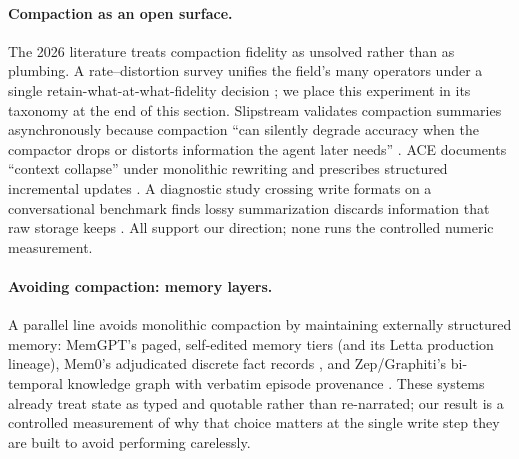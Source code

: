 \documentclass[11pt]{article}
\begin{document}
\paragraph{Compaction as an open surface.}
The 2026 literature treats compaction fidelity as unsolved rather than as
plumbing. A rate--distortion survey unifies the field's many operators under
a single retain-what-at-what-fidelity decision
\citep{colaco2026ratedistortion}; we place this experiment in its taxonomy at
the end of this section.
Slipstream validates compaction summaries asynchronously because compaction
``can silently degrade accuracy when the compactor drops or distorts
information the agent later needs'' \citep{chen2026slipstream}.
ACE documents ``context collapse'' under monolithic rewriting and prescribes
structured incremental updates \citep{zhang2025ace}. A diagnostic study
crossing write formats on a conversational benchmark finds lossy summarization
discards information that raw storage keeps \citep{yuan2026diagnosing}. All
support our direction; none runs the controlled numeric measurement.

\paragraph{Avoiding compaction: memory layers.}
A parallel line avoids monolithic compaction by maintaining externally
structured memory: MemGPT's paged, self-edited memory tiers
\citep{packer2023memgpt} (and its Letta production lineage), Mem0's
adjudicated discrete fact records \citep{chhikara2025mem0}, and Zep/Graphiti's
bi-temporal knowledge graph with verbatim episode provenance
\citep{rasmussen2025zep}. These systems already treat state as typed and
quotable rather than re-narrated; our result is a controlled measurement of
why that choice matters at the single write step they are built to avoid
performing carelessly.
\end{document}
